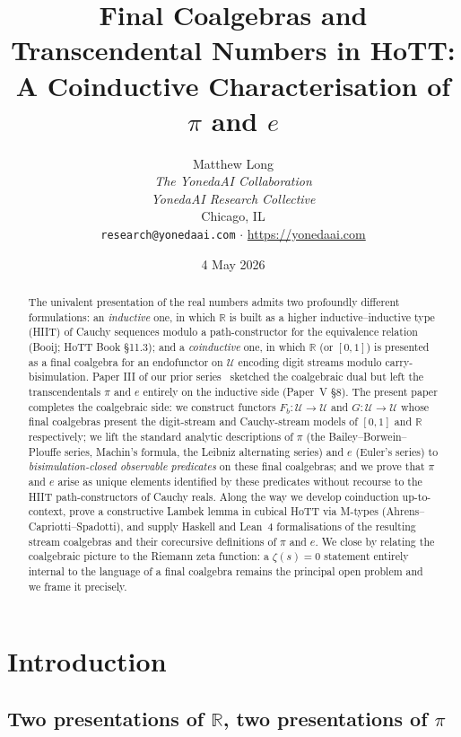 \documentclass[12pt]{article}
\title{Final Coalgebras and Transcendental Numbers in HoTT:\\
A Coinductive Characterisation of $\pi$ and $e$}
\author{Matthew Long \\
\textit{The YonedaAI Collaboration} \\
\textit{YonedaAI Research Collective} \\
Chicago, IL \\
\texttt{research@yonedaai.com} $\cdot$ \url{https://yonedaai.com}}
\date{4 May 2026}
\theoremstyle{definition}
\theoremstyle{remark}
\newcommand{\Type}{\mathcal{U}}
\newcommand{\R}{\mathbb{R}}
\begin{document}
\maketitle

\begin{abstract}
The univalent presentation of the real numbers admits two profoundly
different formulations: an \emph{inductive} one, in which $\R$ is built
as a higher inductive--inductive type (HIIT) of Cauchy sequences modulo
a path-constructor for the equivalence relation
(Booij; HoTT Book \S 11.3); and a \emph{coinductive} one, in which
$\R$ (or $[0,1]$) is presented as a final coalgebra for an endofunctor
on $\Type$ encoding digit streams modulo carry-bisimulation. Paper III
of our prior series~\cite{paperIII} sketched the coalgebraic dual but
left the transcendentals $\pi$ and $e$ entirely on the inductive side
(Paper~V \S 8). The present paper completes the coalgebraic side: we
construct functors $F_b: \Type \to \Type$ and $G: \Type \to \Type$ whose
final coalgebras present the digit-stream and Cauchy-stream models of
$[0,1]$ and $\R$ respectively; we lift the standard analytic
descriptions of $\pi$ (the Bailey--Borwein--Plouffe series, Machin's
formula, the Leibniz alternating series) and $e$ (Euler's series) to
\emph{bisimulation-closed observable predicates} on these final
coalgebras; and we prove that $\pi$ and $e$ arise as unique elements
identified by these predicates without recourse to the
HIIT path-constructors of Cauchy reals. Along the way we develop
coinduction up-to-context, prove a constructive Lambek lemma in cubical
HoTT via M-types (Ahrens--Capriotti--Spadotti), and supply Haskell
and Lean~4 formalisations of the resulting stream coalgebras and
their corecursive definitions of $\pi$ and $e$. We close by relating
the coalgebraic picture to the Riemann zeta function: a $\zeta(s)=0$
statement entirely internal to the language of a final coalgebra
remains the principal open problem and we frame it precisely.
\end{abstract}

\tableofcontents
\newpage

\section{Introduction}

\subsection{\texorpdfstring{Two presentations of $\R$, two presentations of $\pi$}{Two presentations of R, two presentations of pi}}
\end{document}
